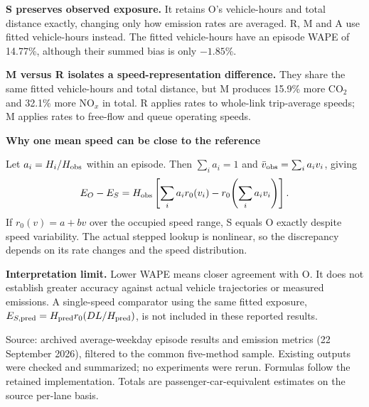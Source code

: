 \documentclass[10pt,a4paper]{article}
\newcommand{\notebox}[1]{\par\vspace{4pt}\begingroup\setlength{\fboxsep}{7pt}\colorbox{pale}{\parbox{\dimexpr\linewidth-14pt\relax}{#1}}\endgroup\par}
\begin{document}
\textbf{S preserves observed exposure.} It retains O's vehicle-hours and total distance exactly,
changing only how emission rates are averaged. R, M and A use fitted vehicle-hours instead.
The fitted vehicle-hours have an episode WAPE of 14.77\%, although their summed bias is only $-1.85$\%.

\textbf{M versus R isolates a speed-representation difference.} They share the same fitted
vehicle-hours and total distance, but M produces 15.9\% more CO$_2$ and 32.1\% more NO$_x$ in total.
R applies rates to whole-link trip-average speeds; M applies rates to free-flow and queue operating speeds.

\notebox{\textbf{Why one mean speed can be close to the reference}\par
Let $a_i=H_i/H_{\rm obs}$ within an episode. Then $\sum_i a_i=1$ and
$\bar v_{\rm obs}=\sum_i a_iv_i$, giving
\[
E_O-E_S=H_{\rm obs}\left[\sum_i a_i r_0(v_i)-r_0\!\left(\sum_i a_iv_i\right)\right].
\]
If $r_0(v)=a+bv$ over the occupied speed range, S equals O exactly despite speed variability.
The actual stepped lookup is nonlinear, so the discrepancy depends on its rate changes and the speed distribution.}

\vspace{8pt}
\textbf{Interpretation limit.} Lower WAPE means closer agreement with O. It does not establish
greater accuracy against actual vehicle trajectories or measured emissions. A single-speed comparator
using the same fitted exposure, $E_{S,\rm pred}=H_{\rm pred}r_0(DL/H_{\rm pred})$, is not included in these reported results.

\vfill
{\fontsize{8}{10}\selectfont\color{muted}
Source: archived average-weekday episode results and emission metrics (22 September 2026),
filtered to the common five-method sample. Existing outputs were checked and summarized; no experiments were rerun.
Formulas follow the retained implementation. Totals are passenger-car-equivalent estimates on the source per-lane basis.}


\end{document}
